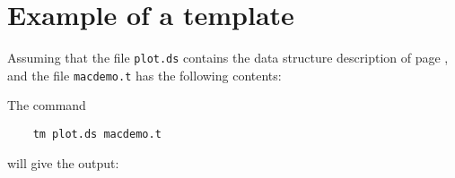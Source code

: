 \chapter{Example of a template}
\label{s.example}
Assuming that the file {\tt plot.ds} contains the data structure description
of page \pageref{plotds},
and the file {\tt macdemo.t} has the following contents:
\begin{flushleft}

\end{flushleft}
The command
\begin{verbatim}
    tm plot.ds macdemo.t
\end{verbatim}
will give the output:
\par
\begin{flushleft}

\end{flushleft}
